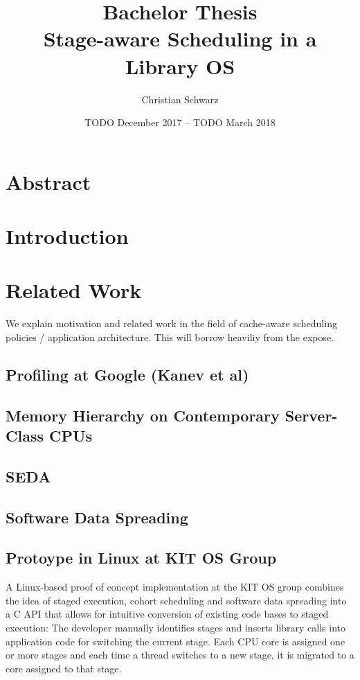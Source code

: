 \documentclass[12pt,a4paper]{article}
\title{{\large Bachelor Thesis}\\Stage-aware Scheduling in a Library OS}
\author{Christian Schwarz}
\date{TODO December 2017 -- TODO March 2018}
\begin{document}
\maketitle

\clearpage

\section{Abstract}

\clearpage

\tableofcontents

\clearpage

\section{Introduction}

\section{Related Work}
We explain motivation and related work in the field of cache-aware scheduling policies / application architecture.
This will borrow heaviliy from the expose.

\subsection{Profiling at Google (Kanev et al)}
\subsection{Memory Hierarchy on Contemporary Server-Class CPUs}
\subsection{SEDA}
\subsection{Software Data Spreading}
\subsection{Protoype in Linux at KIT OS Group}
A Linux-based proof of concept implementation at the KIT OS group combines the idea of staged execution, cohort
scheduling and software data spreading into a C API that allows for intuitive conversion of existing code bases to
staged execution:
The developer manually identifies stages and inserts library calls into application code for switching the current stage.
Each CPU core is assigned one or more stages and each time a thread switches to a new stage, it is migrated to a core
assigned to that stage.
\end{document}
